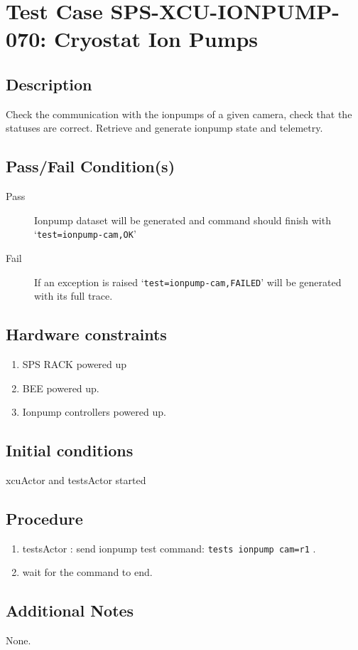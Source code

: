 \section{Test Case SPS-XCU-IONPUMP-070: Cryostat Ion Pumps}

\subsection{Description}

Check the communication with the ionpumps of a given camera, check that the statuses are correct.
Retrieve and generate ionpump state and telemetry.

\subsection{Pass/Fail Condition(s)}

\begin{description}
\item [Pass] Ionpump dataset will be generated and command should finish with `\texttt{test=ionpump-cam,OK}'
\item [Fail] If an exception is raised `\texttt{test=ionpump-cam,FAILED}' will be generated with its full trace.

\end{description}

\subsection{Hardware constraints}

\begin{enumerate}
    \item SPS RACK powered up
    \item BEE powered up.
    \item Ionpump controllers powered up.
\end{enumerate}

\subsection{Initial conditions}

xcuActor and testsActor started

\subsection{Procedure}

\begin{enumerate}
    \item testsActor : send ionpump test command: \texttt{tests ionpump cam=r1} .
    \item wait for the command to end.
\end{enumerate}

\subsection{Additional Notes}
None.
